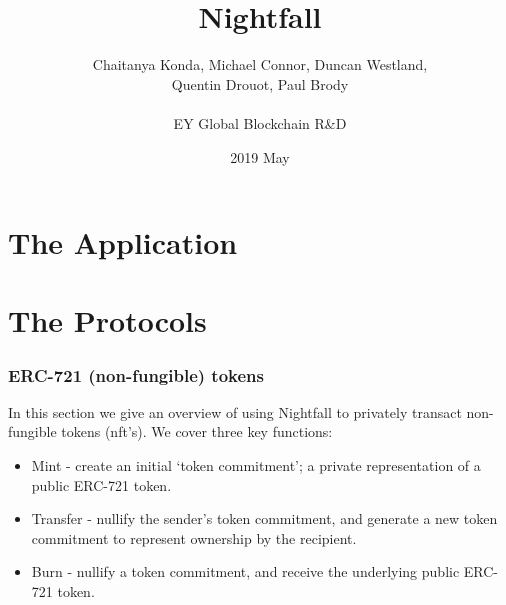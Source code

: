 \documentclass{article}
\title{Nightfall \footnotetext{Document prepared by Michael Connor}}
\date{2019 May}
\author{Chaitanya Konda, Michael Connor, Duncan Westland,\\
Quentin Drouot, Paul Brody\\
\\
EY Global Blockchain R\&D\\
}
\begin{document}
\maketitle %
\dosecttoc %
\dosectlof
\doparttoc %
\tableofcontents %










\newpage
\part{The Application}
\label{part:theApplication}
\parttoc

\newpage


\newpage


\newpage


\newpage


\newpage



\newpage
\part{The Protocols}
\label{part:theProtocols}
\parttoc

\newpage
\section{ERC-721 (non-fungible) tokens}
\label{sec:721}
\secttoc
\mtcskip
\sectlof

\newpage
\noindent
In this section we give an overview of using Nightfall to privately transact non-fungible tokens (nft's). We cover three key functions:
\begin{itemize}
	\item Mint - create an initial `token commitment'; a private representation of a public ERC-721 token.
	\item Transfer - nullify the sender's token commitment, and generate a new token commitment to represent ownership by the recipient.
	\item Burn - nullify a token commitment, and receive the underlying public ERC-721 token.
\end{itemize}
\end{document}
